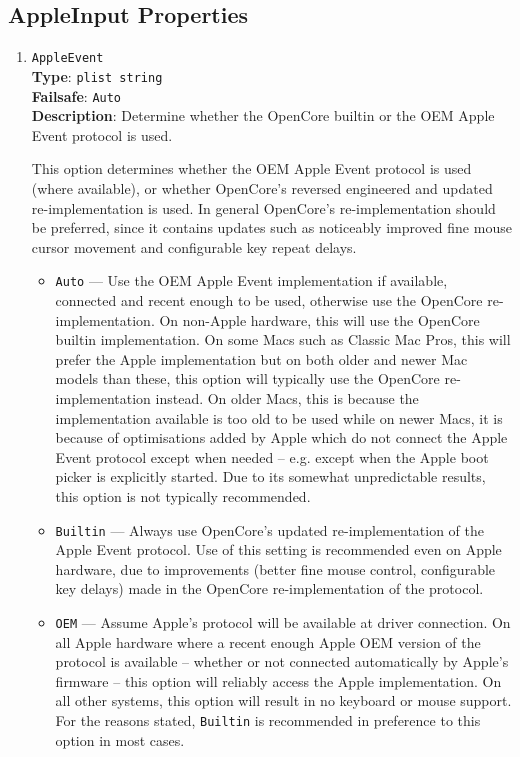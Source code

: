 \documentclass[]{article}
\providecommand{\tightlist}{%
  \setlength{\itemsep}{0pt}\setlength{\parskip}{0pt}}
\begin{document}
\begin{enumerate}
\end{enumerate}

\subsection{AppleInput Properties}\label{uefiappleinputprops}

\begin{enumerate}

\item
  \texttt{AppleEvent}\\
  \textbf{Type}: \texttt{plist\ string}\\
  \textbf{Failsafe}: \texttt{Auto}\\
  \textbf{Description}: Determine whether the OpenCore builtin or the OEM Apple Event protocol is used.

  This option determines whether the OEM Apple Event protocol is used (where available), or
  whether OpenCore's reversed engineered and updated re-implementation is used. In general
  OpenCore's re-implementation should be preferred, since it contains updates such as noticeably
  improved fine mouse cursor movement and configurable key repeat delays.

  \begin{itemize}
  \tightlist
  \item \texttt{Auto} --- Use the OEM Apple Event implementation if available, connected and
  recent enough to be used, otherwise use the OpenCore re-implementation.
  On non-Apple hardware, this will use the OpenCore builtin implementation.
  On some Macs such as Classic Mac Pros, this will prefer the Apple implementation but on both older and
  newer Mac models than these, this option will typically use the OpenCore re-implementation instead.
  On older Macs, this is because the implementation available is too old to be used while on newer Macs,
  it is because of optimisations added by Apple which do not connect the Apple Event protocol
  except when needed -- e.g. except when the Apple boot picker is explicitly started.
  Due to its somewhat unpredictable results, this option is not typically recommended.
  \item \texttt{Builtin} ---  Always use OpenCore's updated re-implementation of the Apple Event protocol.
  Use of this setting is recommended even on Apple hardware, due to
  improvements (better fine mouse control, configurable key delays) made in the OpenCore re-implementation
  of the protocol.
  \item \texttt{OEM} --- Assume Apple's protocol will be available at driver connection. On all Apple hardware
  where a recent enough Apple OEM version of the protocol is available -- whether or not connected automatically
  by Apple's firmware -- this option will reliably access the Apple implementation. On all other systems, this
  option will result in no keyboard or mouse support. For the reasons stated, \texttt{Builtin} is recommended in
  preference to this option in most cases.
  \end{itemize}


\end{enumerate}
\end{document}
